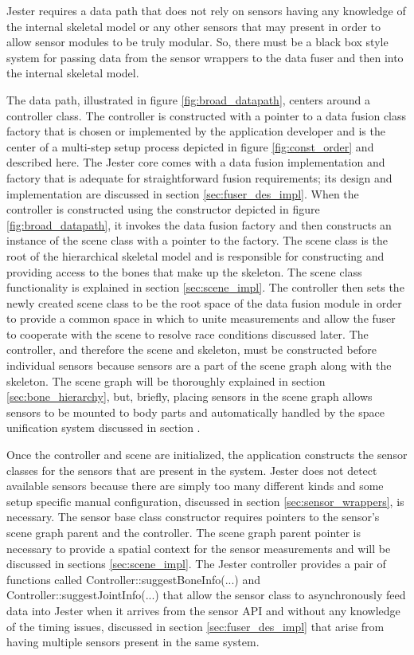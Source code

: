 Jester requires a data path that does not rely on sensors having any knowledge of the internal skeletal model or any other sensors that may present in order to allow sensor modules to be truly modular. So, there must be a black box style system for passing data from the sensor wrappers to the data fuser and then into the internal skeletal model. 

The data path, illustrated in figure \ref{fig:broad_datapath}, centers around a controller class. The controller is constructed with a pointer to a data fusion class factory that is chosen or implemented by the application developer and is the center of a multi-step setup process depicted in figure \ref{fig:const_order} and described here. The Jester core comes with a data fusion implementation and factory that is adequate for straightforward fusion requirements; its design and implementation are discussed in section \ref{sec:fuser_des_impl}. When the controller is constructed using the constructor depicted in figure \ref{fig:broad_datapath}, it invokes the data fusion factory and then constructs an instance of the scene class with a pointer to the factory. The scene class is the root of the hierarchical skeletal model and is responsible for constructing and providing access to the bones that make up the skeleton. The scene class functionality is explained in section \ref{sec:scene_impl}. The controller then sets the newly created scene class to be the root space of the data fusion module in order to provide a common space in which to unite measurements and allow the fuser to cooperate with the scene to resolve race conditions discussed later. The controller, and therefore the scene and skeleton, must be constructed before individual sensors because sensors are a part of the scene graph along with the skeleton. The scene graph will be thoroughly explained in section \ref{sec:bone_hierarchy}, but, briefly, placing sensors in the scene graph allows sensors to be mounted to body parts and automatically handled by the space unification system discussed in section \label{sec:bone_hierarchy}. 

Once the controller and scene are initialized, the application constructs the sensor classes for the sensors that are present in the system. Jester does not detect available sensors because there are simply too many different kinds and some setup specific manual configuration, discussed in section \ref{sec:sensor_wrappers}, is necessary. The sensor base class constructor requires pointers to the sensor’s scene graph parent and the controller. The scene graph parent pointer is necessary to provide a spatial context for the sensor measurements and will be discussed in sections \ref{sec:scene_impl}. The Jester controller provides a pair of functions called Controller::suggestBoneInfo(...) and Controller::suggestJointInfo(...) that allow the sensor class to asynchronously feed data into Jester when it arrives from the sensor API and without any knowledge of the timing issues, discussed in section \ref{sec:fuser_des_impl} that arise from having multiple sensors present in the same system.


